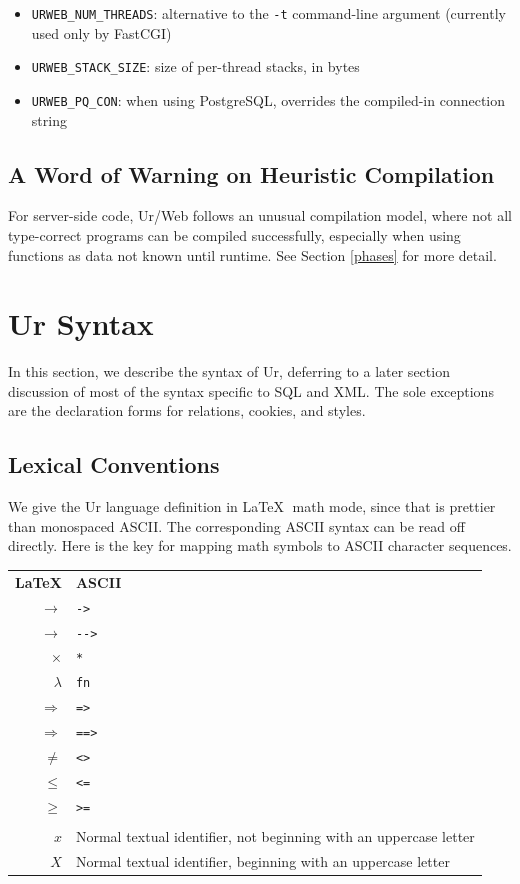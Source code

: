 \documentclass{article}
\newcommand{\cd}[1]{\texttt{#1}}
\begin{document}
\begin{itemize}
  \item \cd{URWEB\_NUM\_THREADS}: alternative to the \cd{-t} command-line argument (currently used only by FastCGI)
  \item \cd{URWEB\_STACK\_SIZE}: size of per-thread stacks, in bytes
  \item \cd{URWEB\_PQ\_CON}: when using PostgreSQL, overrides the compiled-in connection string
\end{itemize}

\subsection{A Word of Warning on Heuristic Compilation}

For server-side code, Ur/Web follows an unusual compilation model, where not all type-correct programs can be compiled successfully, especially when using functions as data not known until runtime.  See Section \ref{phases} for more detail.


\section{Ur Syntax}

In this section, we describe the syntax of Ur, deferring to a later section discussion of most of the syntax specific to SQL and XML.  The sole exceptions are the declaration forms for relations, cookies, and styles.

\subsection{Lexical Conventions}

We give the Ur language definition in \LaTeX $\;$ math mode, since that is prettier than monospaced ASCII.  The corresponding ASCII syntax can be read off directly.  Here is the key for mapping math symbols to ASCII character sequences.

\begin{center}
  \begin{tabular}{rl}
    \textbf{\LaTeX} & \textbf{ASCII} \\
    $\to$ & \cd{->} \\
    $\longrightarrow$ & \cd{-{}->} \\
    $\times$ & \cd{*} \\
    $\lambda$ & \cd{fn} \\
    $\Rightarrow$ & \cd{=>} \\
    $\Longrightarrow$ & \cd{==>} \\
    $\neq$ & \cd{<>} \\
    $\leq$ & \cd{<=} \\
    $\geq$ & \cd{>=} \\
    \\
    $x$ & Normal textual identifier, not beginning with an uppercase letter \\
    $X$ & Normal textual identifier, beginning with an uppercase letter \\
  \end{tabular}
\end{center}
\end{document}

